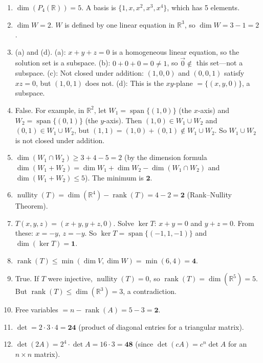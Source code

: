 \documentclass[11pt]{article}
\DeclareMathOperator{\rank}{rank}
\DeclareMathOperator{\nullity}{nullity}
\DeclareMathOperator{\Span}{span}
\begin{document}
\begin{enumerate}

\item $\dim(P_4(\mathbb{R}))=5$. A basis is $\{1, x, x^2, x^3, x^4\}$, which has 5 elements.

\item $\dim W=2$. $W$ is defined by one linear equation in $\mathbb{R}^3$, so $\dim W = 3-1=2$.

\item (a) and (d). (a): $x+y+z=0$ is a homogeneous linear equation, so the solution set is a subspace. (b): $0+0+0=0\neq 1$, so $\vec{0}\notin$ this set---not a subspace. (c): Not closed under addition: $(1,0,0)$ and $(0,0,1)$ satisfy $xz=0$, but $(1,0,1)$ does not. (d): This is the $xy$-plane $=\{(x,y,0)\}$, a subspace.

\item False. For example, in $\mathbb{R}^2$, let $W_1=\Span\{(1,0)\}$ (the $x$-axis) and $W_2=\Span\{(0,1)\}$ (the $y$-axis). Then $(1,0)\in W_1\cup W_2$ and $(0,1)\in W_1\cup W_2$, but $(1,1)=(1,0)+(0,1)\notin W_1\cup W_2$. So $W_1\cup W_2$ is not closed under addition.

\item $\dim(W_1\cap W_2)\ge 3+4-5=2$ (by the dimension formula $\dim(W_1+W_2)=\dim W_1+\dim W_2-\dim(W_1\cap W_2)$ and $\dim(W_1+W_2)\le 5$). The minimum is $\mathbf{2}$.

\item $\nullity(T)=\dim(\mathbb{R}^4)-\rank(T)=4-2=\mathbf{2}$ (Rank--Nullity Theorem).

\item $T(x,y,z)=(x+y,y+z,0)$. Solve $\ker T$: $x+y=0$ and $y+z=0$. From these: $x=-y$, $z=-y$. So $\ker T=\Span\{(-1,1,-1)\}$ and $\dim(\ker T)=\mathbf{1}$.

\item $\rank(T)\le\min(\dim V,\dim W)=\min(6,4)=\mathbf{4}$.

\item True. If $T$ were injective, $\nullity(T)=0$, so $\rank(T)=\dim(\mathbb{R}^5)=5$. But $\rank(T)\le\dim(\mathbb{R}^3)=3$, a contradiction.

\item Free variables $= n-\rank(A)=5-3=\mathbf{2}$.

\item $\det = 2\cdot 3\cdot 4=\mathbf{24}$ (product of diagonal entries for a triangular matrix).

\item $\det(2A)=2^4\cdot\det A=16\cdot 3=\mathbf{48}$ (since $\det(cA)=c^n\det A$ for an $n\times n$ matrix).


\end{enumerate}
\end{document}
